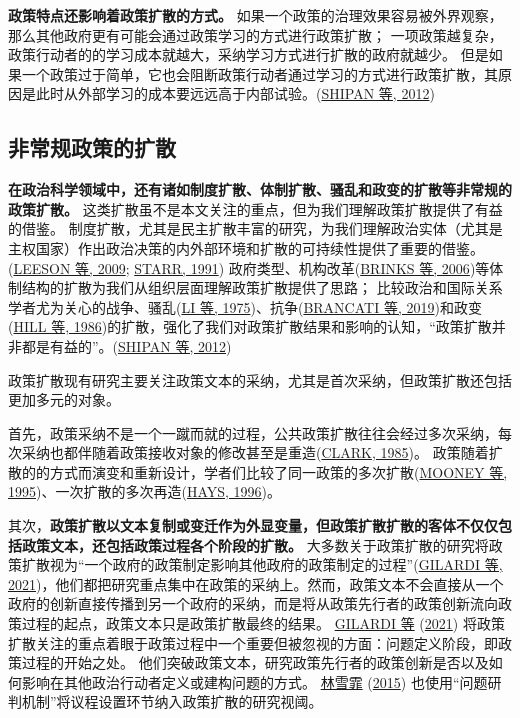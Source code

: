 \documentclass[
  12pt,
]{ctexart}
\begin{document}
\textbf{政策特点还影响着政策扩散的方式。}
如果一个政策的治理效果容易被外界观察，那么其他政府更有可能会通过政策学习的方式进行政策扩散；
一项政策越复杂，政策行动者的的学习成本就越大，采纳学习方式进行扩散的政府就越少。
但是如果一个政策过于简单，它也会阻断政策行动者通过学习的方式进行政策扩散，其原因是此时从外部学习的成本要远远高于内部试验。(\protect\hyperlink{ref-ShipanVolden2012}{SHIPAN 等, 2012})

\hypertarget{ux975eux5e38ux89c4ux653fux7b56ux7684ux6269ux6563}{%
\subsection{非常规政策的扩散}\label{ux975eux5e38ux89c4ux653fux7b56ux7684ux6269ux6563}}

\textbf{在政治科学领域中，还有诸如制度扩散、体制扩散、骚乱和政变的扩散等非常规的政策扩散。}
这类扩散虽不是本文关注的重点，但为我们理解政策扩散提供了有益的借鉴。
制度扩散，尤其是民主扩散丰富的研究，为我们理解政治实体（尤其是主权国家）作出政治决策的内外部环境和扩散的可持续性提供了重要的借鉴。(\protect\hyperlink{ref-LeesonDean2009}{LEESON 等, 2009}; \protect\hyperlink{ref-Starr1991}{STARR, 1991}) 政府类型、机构改革(\protect\hyperlink{ref-BrinksCoppedge2006}{BRINKS 等, 2006})等体制结构的扩散为我们从组织层面理解政策扩散提供了思路；
比较政治和国际关系学者尤为关心的战争、骚乱(\protect\hyperlink{ref-LiThompson1975}{LI 等, 1975})、抗争(\protect\hyperlink{ref-BrancatiLucardi2019}{BRANCATI 等, 2019})和政变(\protect\hyperlink{ref-HillRothchild1986}{HILL 等, 1986})的扩散，强化了我们对政策扩散结果和影响的认知，``政策扩散并非都是有益的''。(\protect\hyperlink{ref-ShipanVolden2012}{SHIPAN 等, 2012})

政策扩散现有研究主要关注政策文本的采纳，尤其是首次采纳，但政策扩散还包括更加多元的对象。

首先，政策采纳不是一个一蹴而就的过程，公共政策扩散往往会经过多次采纳，每次采纳也都伴随着政策接收对象的修改甚至是重造(\protect\hyperlink{ref-Clark1985}{CLARK, 1985})。
政策随着扩散的的方式而演变和重新设计，学者们比较了同一政策的多次扩散(\protect\hyperlink{ref-MooneyLee1995}{MOONEY 等, 1995})、一次扩散的多次再造(\protect\hyperlink{ref-Hays1996}{HAYS, 1996})。

其次，\textbf{政策扩散以文本复制或变迁作为外显变量，但政策扩散扩散的客体不仅仅包括政策文本，还包括政策过程各个阶段的扩散。}
大多数关于政策扩散的研究将政策扩散视为``一个政府的政策制定影响其他政府的政策制定的过程''(\protect\hyperlink{ref-GilardiEtAl2021}{GILARDI 等, 2021})，他们都把研究重点集中在政策的采纳上。然而，政策文本不会直接从一个政府的创新直接传播到另一个政府的采纳，而是将从政策先行者的政策创新流向政策过程的起点，政策文本只是政策扩散最终的结果。
\protect\hyperlink{ref-GilardiEtAl2021}{GILARDI 等} (\protect\hyperlink{ref-GilardiEtAl2021}{2021}) 将政策扩散关注的重点着眼于政策过程中一个重要但被忽视的方面：问题定义阶段，即政策过程的开始之处。 他们突破政策文本，研究政策先行者的政策创新是否以及如何影响在其他政治行动者定义或建构问题的方式。
\protect\hyperlink{ref-LinXueFei2015}{林雪霏} (\protect\hyperlink{ref-LinXueFei2015}{2015}) 也使用``问题研判机制''将议程设置环节纳入政策扩散的研究视阈。
\end{document}
